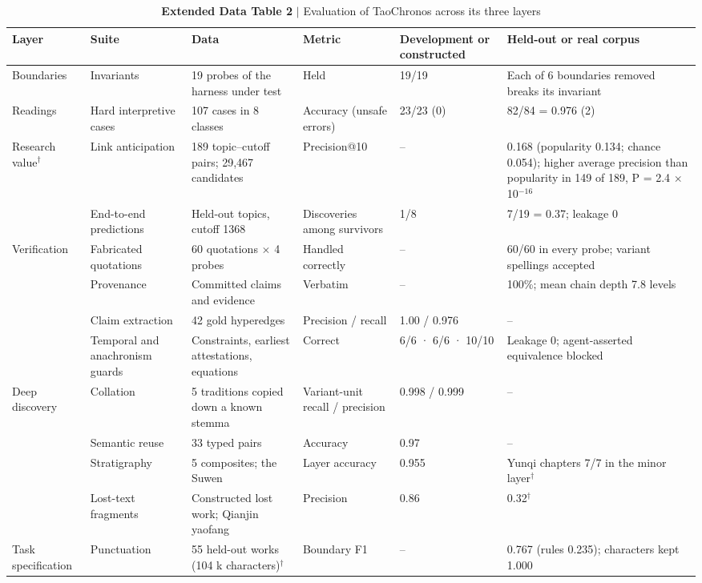 \begin{table}[t]
\small
\caption{\textbf{Extended Data Table 2} $|$ Evaluation of TaoChronos across its three layers}
\begin{tabular}{llllll}
\toprule
Layer & Suite & Data & Metric & Development or constructed & Held-out or real corpus \\
\midrule
Boundaries & Invariants & 19 probes of the harness under test & Held & 19/19 & Each of 6 boundaries removed breaks its invariant \\
Readings & Hard interpretive cases & 107 cases in 8 classes & Accuracy (unsafe errors) & 23/23 (0) & 82/84 = 0.976 (2) \\
Research value$^{\dagger}$ & Link anticipation & 189 topic–cutoff pairs; 29,467 candidates & Precision@10 & – & 0.168 (popularity 0.134; chance 0.054); higher average precision than popularity in 149 of 189, P = 2.4 $\times$ 10$^{-16}$ \\
 & End-to-end predictions & Held-out topics, cutoff 1368 & Discoveries among survivors & 1/8 & 7/19 = 0.37; leakage 0 \\
Verification & Fabricated quotations & 60 quotations $\times$ 4 probes & Handled correctly & – & 60/60 in every probe; variant spellings accepted \\
 & Provenance & Committed claims and evidence & Verbatim & – & 100\%; mean chain depth 7.8 levels \\
 & Claim extraction & 42 gold hyperedges & Precision / recall & 1.00 / 0.976 & – \\
 & Temporal and anachronism guards & Constraints, earliest attestations, equations & Correct & 6/6 · 6/6 · 10/10 & Leakage 0; agent-asserted equivalence blocked \\
Deep discovery & Collation & 5 traditions copied down a known stemma & Variant-unit recall / precision & 0.998 / 0.999 & – \\
 & Semantic reuse & 33 typed pairs & Accuracy & 0.97 & – \\
 & Stratigraphy & 5 composites; the Suwen & Layer accuracy & 0.955 & Yunqi chapters 7/7 in the minor layer$^{\dagger}$ \\
 & Lost-text fragments & Constructed lost work; Qianjin yaofang & Precision & 0.86 & 0.32$^{\dagger}$ \\
Task specification & Punctuation & 55 held-out works (104 k characters)$^{\dagger}$ & Boundary F1 & – & 0.767 (rules 0.235); characters kept 1.000 \\

\end{tabular}
\end{table}
